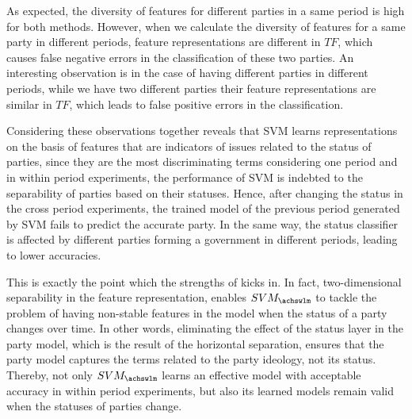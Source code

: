 As expected, the diversity of features for different parties in a same period is high for both methods. However, when we calculate the diversity of features for a same party in different periods, feature representations are different in  $TF$, which causes false negative errors in the classification of these two parties. An interesting observation is in the case of having different parties in different periods, while we have two different parties their feature representations are similar in $TF$, which leads to false positive errors in the classification. 

Considering these observations together reveals that SVM learns representations on the basis of features that are indicators of issues related to the status of parties, since they are the most discriminating terms considering one period and in within period experiments, the performance of SVM is indebted to the separability of parties based on their statuses. Hence, after changing the status in the cross period experiments, the trained model of the previous period generated by SVM fails to predict the accurate party.  In the same way, the status classifier is affected by different parties forming a government in different periods, leading to lower accuracies.   

This is exactly the point which the strengths of \achswlm kicks in. In fact, two\:-\:dimensional separability in the feature representation, enables $SVM_{\achswlm}$ to tackle the problem of having non-stable features in the model when the status of a party changes over time. In other words, eliminating the effect of the status layer in the party model, which is the result of the horizontal separation, ensures that the party model captures the terms related to the party ideology, not its status. Thereby, not only $SVM_{\achswlm}$ learns an effective model with acceptable accuracy in within period experiments, but also its learned models remain valid when the statuses of parties change. 
